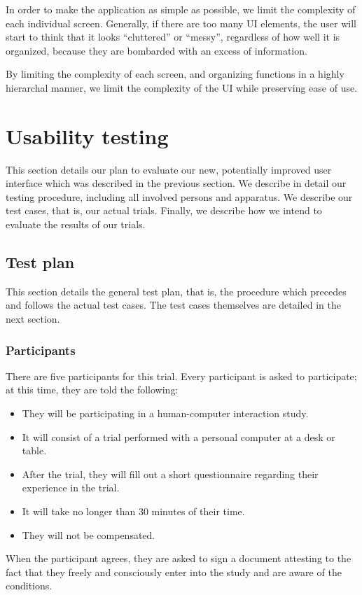 \documentclass{sigchi}
\begin{document}
In order to make the application as simple as possible, we limit the complexity of 
each individual screen. Generally, if there are too many UI elements, the user will
start to think that it looks ``cluttered'' or ``messy'', regardless of how well
it is organized, because they are bombarded with an excess of information. 

By limiting
the complexity of each screen, and organizing functions in a highly hierarchal manner, 
we limit the complexity of the UI while preserving ease of use. 

\section{Usability testing}

\noindent This section details our plan to evaluate our new, potentially improved user
interface which was described in the previous section. We describe in detail our
testing procedure, including all involved persons and apparatus.  We describe
our test cases, that is, our actual trials. Finally, we describe how we intend
to evaluate the results of our trials.

 \subsection{Test plan}
 This section details the general test plan, that is, the procedure which
 precedes and follows the actual test cases. The test cases themselves are 
 detailed in the next section. 
  \subsubsection{Participants}
  There are five participants for this trial. Every participant is asked to participate;
  at this time, they are told the following:
    \begin{itemize}
    \item They will be participating in a human-computer interaction study.
    \item It will consist of a trial performed with a personal computer at a desk or table.
    \item After the trial, they will fill out a short questionnaire regarding their experience in the trial. 
    \item It will take no longer than 30 minutes of their time.
    \item They will not be compensated.
    \end{itemize}
  When the participant agrees, they are asked to sign a document attesting to
  the fact that they freely and consciously enter into the study and are aware
  of the conditions.
\end{document}
